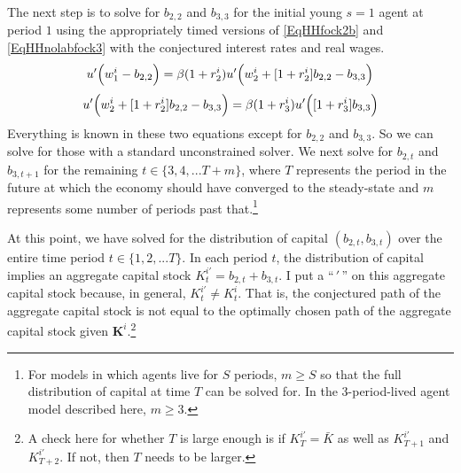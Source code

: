 \documentclass[letterpaper,12pt]{article}
\theoremstyle{definition}
\numberwithin{equation}{section}
\numberwithin{exercise}{section}
\begin{document}
\begin{spacing}{1.5}
      The next step is to solve for $b_{2,2}$ and $b_{3,3}$ for the initial young $s=1$ agent at period $1$ using the appropriately timed versions of \eqref{EqHHfock2b} and \eqref{EqHHnolabfock3} with the conjectured interest rates and real wages.
      \begin{equation}\label{EqHHnolabfock3tpi1}
         u'\Bigl(w_1^i - b_{2,2}\Bigr) = \beta(1 + r_2^i)u'\Bigl(w_2^i + [1 + r_2^i]b_{2,2} - b_{3,3}\Bigr)
      \end{equation}
      \begin{equation}\label{EqEqlfock3tpi2}
         u'\Bigl(w_2^i + [1 + r_2^i]b_{2,2} - b_{3,3}\Bigr) = \beta(1 + r_3^i)u'\Bigl([1 + r_3^i]b_{3,3}\Bigr)
      \end{equation}
      Everything is known in these two equations except for $b_{2,2}$ and $b_{3,3}$. So we can solve for those with a standard unconstrained solver. We next solve for $b_{2,t}$ and $b_{3,t+1}$ for the remaining $t\in\{3,4,...T+m\}$, where $T$ represents the period in the future at which the economy should have converged to the steady-state and $m$ represents some number of periods past that.\footnote{For models in which agents live for $S$ periods, $m\geq S$ so that the full distribution of capital at time $T$ can be solved for. In the 3-period-lived agent model described here, $m\geq 3$.}

      At this point, we have solved for the distribution of capital $(b_{2,t},b_{3,t})$ over the entire time period $t\in\{1,2,...T\}$. In each period $t$, the distribution of capital implies an aggregate capital stock $K_t^{i'} = b_{2,t} + b_{3,t}$. I put a ``$\, ' \,$'' on this aggregate capital stock because, in general, $K_t^{i'}\neq K_t^i$. That is, the conjectured path of the aggregate capital stock is not equal to the optimally chosen path of the aggregate capital stock given $\bm{K}^i$.\footnote{A check here for whether $T$ is large enough is if $K_T^{i'}=\bar{K}$ as well as $K_{T+1}^{i'}$ and $K_{T+2}^{i'}$. If not, then $T$ needs to be larger.}


\end{spacing}
\end{document}
